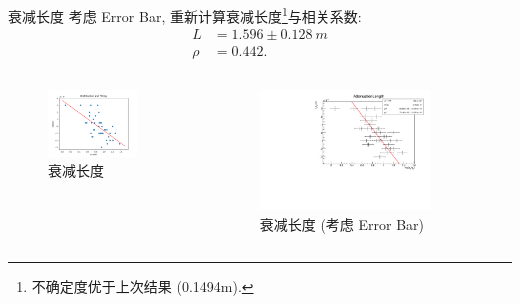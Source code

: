 \documentclass[10pt]{beamer}
\begin{document}
\begin{frame}[label={sec:orgfcb3e5f}]{衰减长度}
考虑 Error Bar, 重新计算衰减长度\footnote{不确定度优于上次结果 (0.1494m).}与相关系数:
\begin{align}
\label{eq:3}
L &= 1.596 \pm \qty{0.128}{m} \\
\rho &= 0.442.
\end{align}

\begin{columns}
\begin{column}{0.5\columnwidth}
\begin{figure}[htbp]
\centering
\includegraphics[width=0.8\textwidth]{../../DetectorPerform/AttenuationLength/figs/Dist.png}
\caption{衰减长度}
\end{figure}
\end{column}

\begin{column}{0.5\columnwidth}
\begin{figure}[htbp]
\centering
\includegraphics[width=0.8\textwidth]{../../DetectorPerform/AttenuationLength/figs/AttenuationLength.pdf}
\caption{衰减长度 (考虑 Error Bar)}
\end{figure}
\end{column}
\end{columns}
\end{frame}
\end{document}
